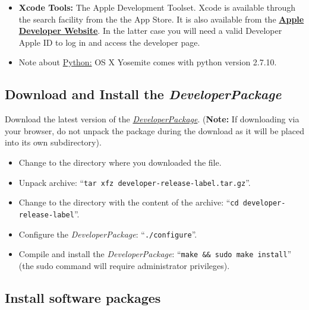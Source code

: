 \documentclass[12pt]{article}
\begin{document}
\begin{itemize}
\item[]{\bf Xcode Tools:} The Apple Development Toolset. Xcode is available through the search facility from the the App Store. It is also available from the \href{http://developer.apple.com/technology/xcode.html}{\bf Apple Developer Website}. In the latter case  you will need a valid Developer Apple ID to log in and access the developer page.
   
\item[]Note about \href{http://python.org/}{Python:} OS X Yosemite comes with python version 2.7.10.
\end{itemize}
   

\subsection*{Download and Install the {\it DeveloperPackage}}

Download the latest version of the \href{https://github.com/HugoCornelis/developer/blob/master/developer-0.0.0-alpha.tar.gz?raw=true}{{\it DeveloperPackage}}.  ({\bf Note:} If downloading via your browser, do not unpack the package during the download as it will be placed into its own subdirectory).

\begin{itemize}
   \item[] Change to the directory where you downloaded the file.
   \item[] Unpack archive: ``{\tt tar xfz developer-release-label.tar.gz}''.
   \item[] Change to the directory with the content of the archive: ``{\tt cd developer-release-label}''.
   \item[] Configure the {\it DeveloperPackage}: ``{\tt ./configure}''.
   \item[] Compile and install the {\it DeveloperPackage}: ``{\tt make \&\& sudo make install}'' (the sudo command will require administrator privileges).
\end{itemize}


\subsection*{Install software packages}
\end{document}
